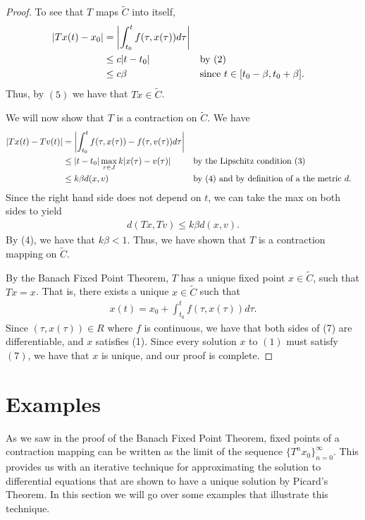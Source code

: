 \documentclass[10pt,a4paper]{article}
\theoremstyle{theorem}
\theoremstyle{definition}
\begin{document}
\begin{proof}
To see that $T$ maps $\tilde{C}$ into itself,
\begin{align*}
|Tx(t) - x_0| &= \left|\int_{t_0}^{t} f(\tau, x(\tau))d \tau \Large\right|\\
&\leq c|t - t_0| && \text{by (2)}\\
&\leq c \beta && \text{since } t \in [t_0 - \beta, t_0 + \beta].
\end{align*}
Thus, by $(5)$ we have that $Tx \in \tilde{C}$.

We will now show that $T$ is a contraction on $\tilde{C}$. We have
\begin{align*}
|Tx(t) - Tv(t)| &= \left|\int_{t_0}^{t} f(\tau, x(\tau)) - f(\tau, v(\tau))d \tau \Large\right|\\
&\leq |t - t_0| \max_{\tau \in J} k|x(\tau) - v(\tau)| && \text{by the Lipschitz condition (3)}\\
&\leq k \beta d(x, v) && \text{by (4) and by definition of a the metric } d.
\end{align*}
Since the right hand side does not depend on $t$, we can take the max on both sides to yield 
\begin{align*}
d(Tx, Tv) \leq k \beta d(x, v).
\end{align*}
By (4), we have that $k \beta < 1$. Thus, we have shown that $T$ is a contraction mapping on $\tilde{C}$.

By the Banach Fixed Point Theorem, $T$ has a unique fixed point $x \in \tilde{C}$, such that $Tx = x$. That is, there exists a unique $x \in \tilde{C}$ such that 
\begin{align}
x(t) = x_0 + \int_{t_0}^{t} f(\tau, x(\tau))d \tau.
\end{align}
Since $(\tau, x(\tau)) \in R$ where $f$ is continuous, we have that both sides of (7) are differentiable,  and $x$ satisfies (1).  Since every solution $x$ to $(1)$ must satisfy $(7)$,  we have that $x$ is unique, and our proof is complete.
\end{proof}

\section*{Examples}
As we saw in the proof of the Banach Fixed Point Theorem, fixed points of a contraction mapping can be written as the limit of the sequence $\{T^n x_0 \}_{n = 0}^\infty$. This provides us with an iterative technique for approximating the solution to differential equations that are shown to have a unique solution by Picard's Theorem. In this section we will go over some examples that illustrate this technique.
\end{document}
